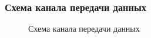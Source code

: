 \begin{frame}
    \frametitle{Схема канала передачи данных}
    
    \begin{figure}
        \begin{center}
            \caption{Схема канала передачи данных}\label{pict:channel}
        \end{center}
    \end{figure} 
\end{frame}


